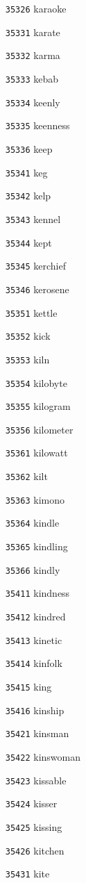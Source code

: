 \documentclass[twoside,11pt]{article}
\begin{document}
\begin{multicols}{5}
\begin{enumerate}
\item[\texttt{35326}] karaoke
\item[\texttt{35331}] karate
\item[\texttt{35332}] karma
\item[\texttt{35333}] kebab
\item[\texttt{35334}] keenly
\item[\texttt{35335}] keenness
\item[\texttt{35336}] keep
\item[\texttt{35341}] keg
\item[\texttt{35342}] kelp
\item[\texttt{35343}] kennel
\item[\texttt{35344}] kept
\item[\texttt{35345}] kerchief
\item[\texttt{35346}] kerosene
\item[\texttt{35351}] kettle
\item[\texttt{35352}] kick
\item[\texttt{35353}] kiln
\item[\texttt{35354}] kilobyte
\item[\texttt{35355}] kilogram
\item[\texttt{35356}] kilometer
\item[\texttt{35361}] kilowatt
\item[\texttt{35362}] kilt
\item[\texttt{35363}] kimono
\item[\texttt{35364}] kindle
\item[\texttt{35365}] kindling
\item[\texttt{35366}] kindly
\item[\texttt{35411}] kindness
\item[\texttt{35412}] kindred
\item[\texttt{35413}] kinetic
\item[\texttt{35414}] kinfolk
\item[\texttt{35415}] king
\item[\texttt{35416}] kinship
\item[\texttt{35421}] kinsman
\item[\texttt{35422}] kinswoman
\item[\texttt{35423}] kissable
\item[\texttt{35424}] kisser
\item[\texttt{35425}] kissing
\item[\texttt{35426}] kitchen
\item[\texttt{35431}] kite

\end{enumerate}
\end{multicols}
\end{document}
